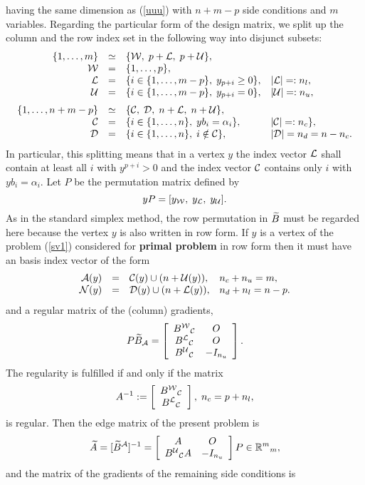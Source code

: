 having the same dimension as (\ref{uuu}) with $n+m-p$ side conditions and $m$
variables.  Regarding the particular form of the design matrix, we split up the
column and the row index set in the following way into disjunct subsets:
%
\begin{equation} \label{ph3}
\ba{.}{rcll}
\{1, \ldots,m\} &\simeq& \{\W, \; p + \L, \; p + \U\},\\
\W &=& \{1, \ldots, p\},\\
\L &=& \{i \in \{1, \ldots, m - p\}, \; y_{p+i} \geq 0 \}, & |\L| =: n_l,\\
\U &=& \{i \in \{1, \ldots, m - p\}, \; y_{p+i} = 0\}, & |\U| =: n_u,\\[2mm]
\{1, \ldots,n+m-p\} &\simeq& \{\C, \; \D, \; n + \L, \; n + \U\},\\
\C &=& \{i \in \{1, \ldots, n\}, \; yb_i = \alpha _i\}, &
|\C| =: n_c\},\\
 \D &=& \{i \in \{1, \ldots, n\}, \; i \notin \C \}, &
|\D| = n_d = n - n_c. \ea{.}
\end{equation}
In particular, this splitting means that in a vertex $y$ the index
vector $\L$ shall contain at least all $i$ with $y^{p+i} > 0$ and the index
vector $\C$ contains only $i$ with $yb_i = \alpha _i$.
Let $P$ be the permutation matrix defined
by \[
yP = [y_{\W}, \; y_{\L}, \; y_{\U}].
\]
As in the standard simplex method, the row permutation in $\wi{B}$ must be
regarded here because the vertex $y$ is also written in row form.
If $y$ is a vertex of the problem (\ref{sv1}) considered for {\bf
primal problem} in row form then it must have  an basis index vector of the
form
\[\ba{.}{rcll}
\A(y) &=& \C(y) \cup (n + \U(y)), & n_c + n_u = m,\\
\N(y) &=& \D(y) \cup (n + \L(y)), & n_d + n_l = n-p.
\ea{.}
\]
and a regular matrix of the (column) gradients,
%
\[
P\wi{B}_{\A} = \ba{[}{cc}
         B^{\W}{}_{\C} & O\\ B^{\L}{}_{\C} & O\\ B^{\U}{}_{\C} & -I_{n_u}
                  \ea{]}.
\]
The regularity is fulfilled if and only if the matrix
%
\begin{equation} \label{hjh}
A^{-1} := \ba{[}{c}B^{\W}{}_{\C} \\ B^{\L}{}_{\C} \ea{]}, \;
n_c = p + n_l,
\end{equation}
is regular. Then the edge matrix of the present problem is
%
\[
\wi{A} = [\wi{B}^{\A}]^{-1} = \ba{[}{cc} A & O\\ B^{\U}{}_{\C}A & -
I_{n_u}\ea{]}P  \in \Bbb{R}^m{}_m,
\]
and the matrix of the gradients of the remaining side conditions is
